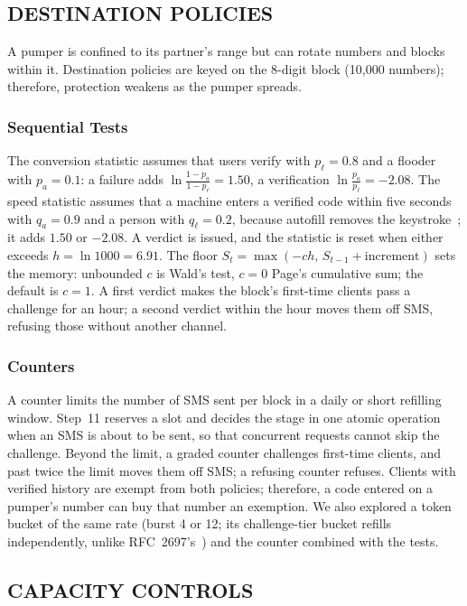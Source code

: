 \documentclass{IEEEoj}
\begin{document}
\subsection{DESTINATION POLICIES}
\label{sec:blocks}

A pumper is confined to its partner's range but can rotate numbers and blocks within it. Destination policies are keyed on the 8-digit block (10,000 numbers); therefore, protection weakens as the pumper spreads.

\subsubsection{Sequential Tests}
The conversion statistic assumes that users verify with $p_\ell = 0.8$ and a flooder with $p_a = 0.1$: a failure adds $\ln\frac{1-p_a}{1-p_\ell} = 1.50$, a verification $\ln\frac{p_a}{p_\ell} = -2.08$. The speed statistic assumes that a machine enters a verified code within five seconds with $q_a = 0.9$ and a person with $q_\ell = 0.2$, because autofill removes the keystroke~\cite{google_smsretriever,wicg_webotp}; it adds $1.50$ or $-2.08$. A verdict is issued, and the statistic is reset when either exceeds $h = \ln 1000 = 6.91$. The floor $S_t = \max(-ch,\, S_{t-1} + \text{increment})$ sets the memory: unbounded $c$ is Wald's test, $c = 0$ Page's cumulative sum; the default is $c = 1$. A first verdict makes the block's first-time clients pass a challenge for an hour; a second verdict within the hour moves them off SMS, refusing those without another channel.

\subsubsection{Counters}
A counter limits the number of SMS sent per block in a daily or short refilling window. Step~11 reserves a slot and decides the stage in one atomic operation when an SMS is about to be sent, so that concurrent requests cannot skip the challenge. Beyond the limit, a graded counter challenges first-time clients, and past twice the limit moves them off SMS; a refusing counter refuses. Clients with verified history are exempt from both policies; therefore, a code entered on a pumper's number can buy that number an exemption. We also explored a token bucket of the same rate (burst 4 or 12; its challenge-tier bucket refills independently, unlike RFC~2697's~\cite{rfc2697}) and the counter combined with the tests.

\subsection{CAPACITY CONTROLS}
\end{document}
